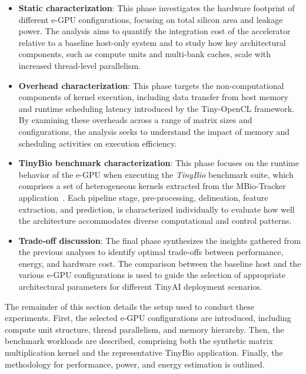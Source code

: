         \vspace{-1em}
        \begin{itemize}
            \item \textbf{Static characterization}: This phase investigates the hardware footprint of different \mbox{e-GPU} configurations, focusing on total silicon area and leakage power. The analysis aims to quantify the integration cost of the accelerator relative to a baseline host-only system and to study how key architectural components, such as compute units and multi-bank caches, scale with increased thread-level parallelism.
            
            \item \textbf{Overhead characterization}: This phase targets the non-computational components of kernel execution, including data transfer from host memory and runtime scheduling latency introduced by the \mbox{Tiny-OpenCL} framework. By examining these overheads across a range of matrix sizes and configurations, the analysis seeks to understand the impact of memory and scheduling activities on execution efficiency.
            
            \item \textbf{TinyBio benchmark characterization}: This phase focuses on the runtime behavior of the \mbox{e-GPU} when executing the \emph{TinyBio} benchmark suite, which comprises a set of heterogeneous kernels extracted from the MBio-Tracker application~\cite{mbio_tracker}. Each pipeline stage, pre-processing, delineation, feature extraction, and prediction, is characterized individually to evaluate how well the architecture accommodates diverse computational and control patterns.
            
            \item \textbf{Trade-off discussion}: The final phase synthesizes the insights gathered from the previous analyses to identify optimal trade-offs between performance, energy, and hardware cost. The comparison between the baseline host and the various \mbox{e-GPU} configurations is used to guide the selection of appropriate architectural parameters for different TinyAI deployment scenarios.
        \end{itemize}
        \vspace{-1em}
        
        The remainder of this section details the setup used to conduct these experiments. First, the selected \mbox{e-GPU} configurations are introduced, including compute unit structure, thread parallelism, and memory hierarchy. Then, the benchmark workloads are described, comprising both the synthetic matrix multiplication kernel and the representative TinyBio application. Finally, the methodology for performance, power, and energy estimation is outlined.

